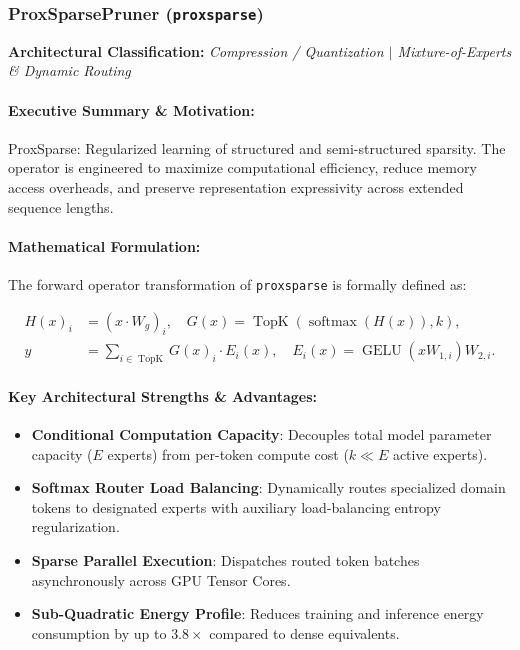 \subsubsection{ProxSparsePruner (\texttt{proxsparse})}
\label{sec:module_proxsparse}

\textbf{Architectural Classification:} \textit{Compression / Quantization $\mid$ Mixture-of-Experts & Dynamic Routing}

\paragraph{Executive Summary \& Motivation:}
ProxSparse: Regularized learning of structured and semi-structured sparsity. The operator is engineered to maximize computational efficiency, reduce memory access overheads, and preserve representation expressivity across extended sequence lengths.

\paragraph{Mathematical Formulation:}
The forward operator transformation of \texttt{proxsparse} is formally defined as:

\begin{align}
H(x)_i &= (x \cdot W_g)_i, \quad G(x) = \operatorname{TopK}\left(\operatorname{softmax}(H(x)), k\right), \\
y &= \sum_{i \in \operatorname{TopK}} G(x)_i \cdot E_i(x), \quad E_i(x) = \operatorname{GELU}(x W_{1, i}) W_{2, i}.
\end{align}


\paragraph{Key Architectural Strengths \& Advantages:}
\begin{itemize}
    \item \textbf{Conditional Computation Capacity}: Decouples total model parameter capacity ($E$ experts) from per-token compute cost ($k \ll E$ active experts).
    \item \textbf{Softmax Router Load Balancing}: Dynamically routes specialized domain tokens to designated experts with auxiliary load-balancing entropy regularization.
    \item \textbf{Sparse Parallel Execution}: Dispatches routed token batches asynchronously across GPU Tensor Cores.
    \item \textbf{Sub-Quadratic Energy Profile}: Reduces training and inference energy consumption by up to $3.8\times$ compared to dense equivalents.
\end{itemize}

